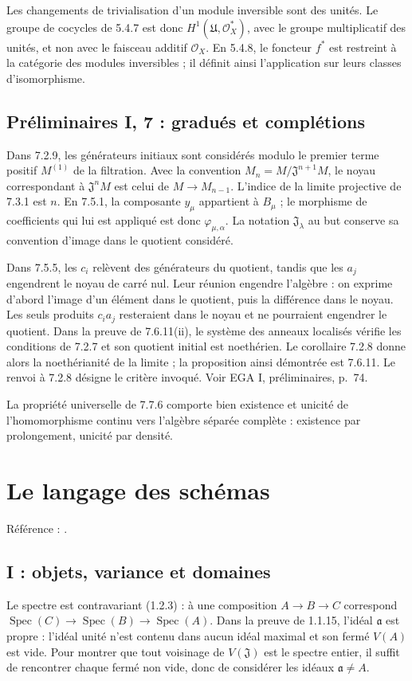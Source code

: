 \documentclass[11pt,a4paper]{article}
\begin{document}
Les changements de trivialisation d'un module inversible sont des
unités. Le groupe de cocycles de 5.4.7 est donc
$H^1(\mathfrak U,\mathcal O_X^*)$, avec le groupe multiplicatif des
unités, et non avec le faisceau additif $\mathcal O_X$.
En 5.4.8, le foncteur $f^*$ est restreint à la catégorie des modules
inversibles ; il définit ainsi l'application sur leurs classes
d'isomorphisme.

\subsection{Préliminaires I, 7 : gradués et complétions}
\label{note:base0-completion}
Dans 7.2.9, les générateurs initiaux sont considérés modulo le premier
terme positif $M^{(1)}$ de la filtration. Avec la convention
$M_n=M/\mathfrak J^{n+1}M$, le noyau correspondant à
$\mathfrak J^nM$ est celui de $M\to M_{n-1}$.
L'indice de la limite projective de 7.3.1 est $n$.
En 7.5.1, la composante $y_\mu$ appartient à $B_\mu$ ; le morphisme
de coefficients qui lui est appliqué est donc $\varphi_{\mu,\alpha}$.
La notation $\mathfrak J_\lambda$ au but conserve sa convention
d'image dans le quotient considéré.

Dans 7.5.5, les $c_i$ relèvent des générateurs du quotient, tandis
que les $a_j$ engendrent le noyau de carré nul. Leur réunion engendre
l'algèbre : on exprime d'abord l'image d'un élément dans le quotient,
puis la différence dans le noyau. Les seuls produits $c_ia_j$
resteraient dans le noyau et ne pourraient engendrer le quotient.
Dans la preuve de 7.6.11(ii), le système des anneaux localisés
vérifie les conditions de 7.2.7 et son quotient initial est noethérien.
Le corollaire 7.2.8 donne alors la noethérianité de la limite ; la
proposition ainsi démontrée est 7.6.11. Le renvoi à 7.2.8 désigne le
critère invoqué. Voir EGA I, préliminaires, p.~74.

La propriété universelle de 7.7.6 comporte bien existence et unicité
de l'homomorphisme continu vers l'algèbre séparée complète : existence
par prolongement, unicité par densité.
\par

\section{Le langage des schémas}
\label{part:base1}
Référence : \cite{EGAI}.
\subsection{I : objets, variance et domaines}
\label{note:base1-functorial}
Le spectre est contravariant (1.2.3) : à une composition
$A\to B\to C$ correspond $\operatorname{Spec}(C)\to
\operatorname{Spec}(B)\to\operatorname{Spec}(A)$.
Dans la preuve de 1.1.15, l'idéal $\mathfrak a$ est propre :
l'idéal unité n'est contenu dans aucun idéal maximal et son fermé
$V(A)$ est vide. Pour montrer que tout voisinage de $V(\mathfrak J)$
est le spectre entier, il suffit de rencontrer chaque fermé non vide,
donc de considérer les idéaux $\mathfrak a\ne A$.
\end{document}
